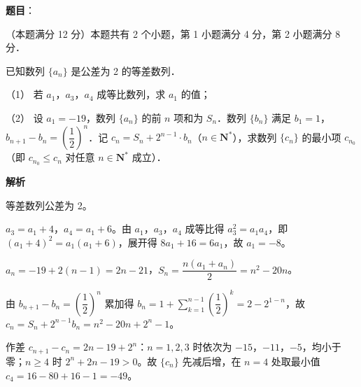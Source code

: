 \begin{answer}

\textbf{题目}：

（本题满分 12 分）本题共有 2 个小题，第 1 小题满分 4 分，第 2 小题满分 8 分．

已知数列 \(\{a_{n}\}\) 是公差为 2 的等差数列．

（1） 若 \(a_{1}\)，\(a_{3}\)，\(a_{4}\) 成等比数列，求 \(a_{1}\) 的值；

（2） 设 \(a_{1}=-19\)，数列 \(\{a_{n}\}\) 的前 \(n\) 项和为 \(S_{n}\)．数列 \(\{b_{n}\}\) 满足 \(b_{1}=1\)，\(b_{n+1}-b_{n}=\left(\dfrac{1}{2}\right)^{n}\)．记 \(c_{n}=S_{n}+2^{n-1}\cdot b_{n}\)（\(n\in\mathbf{N}^{*}\)），求数列 \(\{c_{n}\}\) 的最小项 \(c_{n_{0}}\)（即 \(c_{n_{0}}\leqslant c_{n}\) 对任意 \(n\in\mathbf{N}^{*}\) 成立）．

\textbf{解析}

等差数列公差为 2。


\(a_{3}=a_{1}+4\)，\(a_{4}=a_{1}+6\)。由 \(a_{1}\)，\(a_{3}\)，\(a_{4}\) 成等比得 \(a_{3}^{2}=a_{1}a_{4}\)，即 \((a_{1}+4)^{2}=a_{1}(a_{1}+6)\)，展开得 \(8a_{1}+16=6a_{1}\)，故 \(a_{1}=-8\)。


\(a_{n}=-19+2(n-1)=2n-21\)，\(S_{n}=\dfrac{n(a_{1}+a_{n})}{2}=n^{2}-20n\)。

由 \(b_{n+1}-b_{n}=\left(\dfrac{1}{2}\right)^{n}\) 累加得 \(b_{n}=1+\sum_{k=1}^{n-1}\left(\dfrac{1}{2}\right)^{k}=2-2^{1-n}\)，故 \(c_{n}=S_{n}+2^{n-1}b_{n}=n^{2}-20n+2^{n}-1\)。

作差 \(c_{n+1}-c_{n}=2n-19+2^{n}\)：\(n=1,2,3\) 时依次为 \(-15\)，\(-11\)，\(-5\)，均小于零；\(n\geqslant 4\) 时 \(2^{n}+2n-19>0\)。故 \(\{c_{n}\}\) 先减后增，在 \(n=4\) 处取最小值 \(c_{4}=16-80+16-1=-49\)。



\end{answer}
